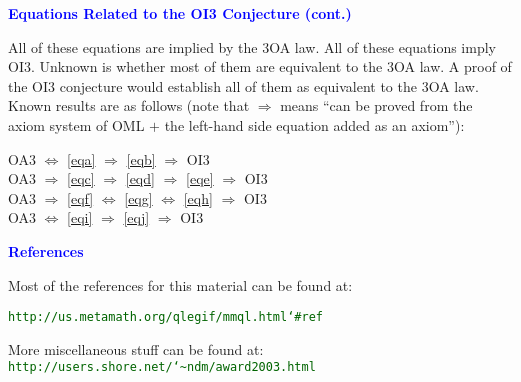 \documentclass{slides}
\begin{document}
\begin{slide}
\textcolor{blue}{\textbf{Equations Related to the OI3 Conjecture (cont.)}}

All of these equations are implied by the 3OA law.  All of
these equations imply OI3.  Unknown is whether most of them are
equivalent to the 3OA law.  A proof of the OI3 conjecture would
establish all of them as equivalent to the 3OA law.  Known results
are as follows
(note that $\Rightarrow$ means ``can be proved from the axiom
system of OML $+$ the left-hand side equation added as an axiom''):

\qquad   OA3 $\Leftrightarrow$ \ref{eqa} $\Rightarrow$ \ref{eqb}
   $\Rightarrow$ OI3\\
\qquad   OA3 $\Rightarrow$ \ref{eqc} $\Rightarrow$ \ref{eqd}
    $\Rightarrow$ \ref{eqe}  $\Rightarrow$ OI3 \\
\qquad   OA3 $\Rightarrow$ \ref{eqf} $\Leftrightarrow$
    \ref{eqg} $\Leftrightarrow$ \ref{eqh}  $\Rightarrow$ OI3\\
\qquad   OA3 $\Leftrightarrow$ \ref{eqi}
  $\Rightarrow$ \ref{eqj}  $\Rightarrow$ OI3

\end{slide}

\begin{slide}

\begin{center}
\textcolor{blue}{\textbf{References}}

Most of the references for this material can be found at:

\textcolor{darkgreen}{
\texttt{http://us.metamath.org/qlegif/mmql.html{\char`\#}ref}}

\vspace{3ex}

More miscellaneous stuff can be found at:\\
\textcolor{darkgreen}{
\texttt{http://users.shore.net/{\char`\~}ndm/award2003.html}}

\end{center}
\end{slide}
\end{document}

